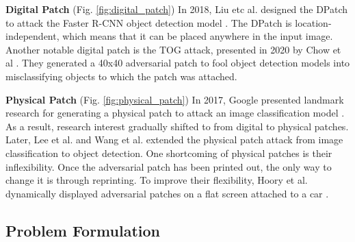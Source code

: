 \textbf{Digital Patch} (Fig. \ref{fig:digital_patch}) In 2018, Liu etc al. designed the DPatch \cite{liu2018dpatch} to attack the Faster R-CNN object detection model \cite{ren2015faster}. The DPatch is location-independent, which means that it can be placed anywhere in the input image. Another notable digital patch is the TOG attack, presented in 2020 by Chow et al \cite{chow2020adversarial}. They generated a 40x40 adversarial patch to fool object detection models into misclassifying objects to which the patch was attached.

\textbf{Physical Patch} (Fig. \ref{fig:physical_patch}) In 2017, Google presented landmark research for generating a physical patch to attack an image classification model \cite{brown2017patch}. As a result, research interest gradually shifted to from digital to physical patches. Later, Lee et al. \cite{lee2019physical} and Wang et al. \cite{wang2021daedalus} extended the physical patch attack from image classification to object detection. One shortcoming of physical patches is their inflexibility. Once the adversarial patch has been printed out, the only way to change it is through reprinting. To improve their flexibility, Hoory et al. dynamically displayed adversarial patches on a flat screen attached to a car \cite{hoory2020dynamic}.




\subsection{Problem Formulation} 

